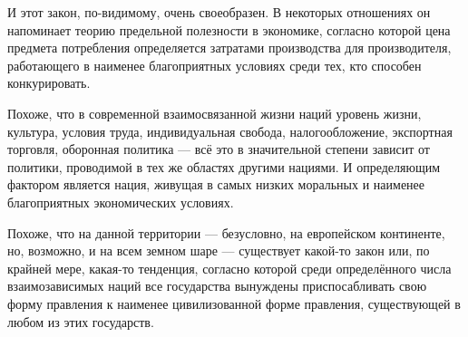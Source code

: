 И этот закон, по-видимому, очень своеобразен. В некоторых отношениях он напоминает теорию предельной полезности в экономике, согласно которой цена предмета потребления определяется затратами производства для производителя, работающего в наименее благоприятных условиях среди тех, кто способен конкурировать.

Похоже, что в современной взаимосвязанной жизни наций уровень жизни, культура, условия труда, индивидуальная свобода, налогообложение, экспортная торговля, оборонная политика — всё это в значительной степени зависит от политики, проводимой в тех же областях другими нациями. И определяющим фактором является нация, живущая в самых низких моральных и наименее благоприятных экономических условиях.
 
Похоже, что на данной территории — безусловно, на европейском континенте, но, возможно, и на всем земном шаре — существует какой-то закон или, по крайней мере, какая-то тенденция, согласно которой среди определённого числа взаимозависимых наций все государства вынуждены приспосабливать свою форму правления к наименее цивилизованной форме правления, существующей в любом из этих государств.
